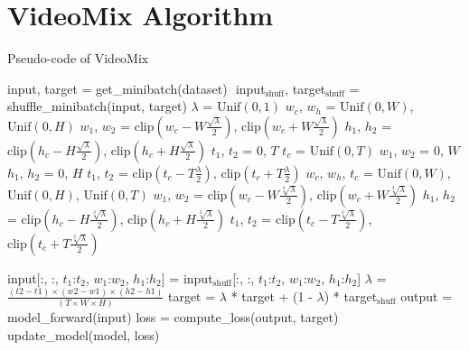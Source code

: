 \section{VideoMix Algorithm}
\label{appendix:algorithm}

\algnewcommand{}%
\algnewcommand{}%
\begin{algorithm*}[!t]
\small
  \caption{Pseudo-code of VideoMix}
  \begin{algorithmic}[1]
    \State input, target = get\_minibatch(dataset) 
    \Statex $ $  
            \State input$_\text{shuff}$, target$_\text{shuff}$ = shuffle\_minibatch(input, target) 
            \State $\lambda$ = $\text{Unif}(0,1)$
                \State $w_c$, $w_h$ = $\text{Unif}(0,W)$, $\text{Unif}(0,H)$
                \State $w_1$, $w_2$ = $\text{clip}(w_c-W\frac{\sqrt{\lambda}}{2})$, $\text{clip}(w_c+W\frac{\sqrt{\lambda}}{2})$
                \State $h_1$, $h_2$ = $\text{clip}(h_c-H\frac{\sqrt{\lambda}}{2})$, $\text{clip}(h_c+H\frac{\sqrt{\lambda}}{2})$
                \State $t_1$, $t_2$ = $0$, $T$
                \State $t_c$ = $\text{Unif}(0,T)$
                \State $w_1$, $w_2$ = $0$, $W$
                \State $h_1$, $h_2$ = $0$, $H$
                \State $t_1$, $t_2$ = $\text{clip}(t_c-T\frac{{\lambda}}{2})$, $\text{clip}(t_c+T\frac{{\lambda}}{2})$
                \State $w_c$, $w_h$, $t_c$ = $\text{Unif}(0,W)$, $\text{Unif}(0,H)$, $\text{Unif}(0,T)$
                \State $w_1$, $w_2$ = $\text{clip}(w_c-W\frac{\sqrt[3]{\lambda}}{2})$, $\text{clip}(w_c+W\frac{\sqrt[3]{\lambda}}{2})$
                \State $h_1$, $h_2$ = $\text{clip}(h_c-H\frac{\sqrt[3]{\lambda}}{2})$, $\text{clip}(h_c+H\frac{\sqrt[3]{\lambda}}{2})$
                \State $t_1$, $t_2$ = $\text{clip}(t_c-T\frac{\sqrt[3]{\lambda}}{2})$, $\text{clip}(t_c+T\frac{\sqrt[3]{\lambda}}{2})$                
            \EndIf
            
            \State input[:, :, $t_1$:$t_2$, $w_1$:$w_2$, $h_1$:$h_2$] = input$_\text{shuff}$[:, :, $t_1$:$t_2$, $w_1$:$w_2$, $h_1$:$h_2$]
            \State $\lambda$ = $\frac{(t2-t1)\times(w2-w1)\times(h2-h1)}{(T\times W\times H)}$ 
            \State target = $\lambda$ * target + (1 - $\lambda$) * target$_\text{shuff}$%
        \EndIf
        \State output = model\_forward(input)
        \State loss = compute\_loss(output, target)
        \State update\_model(model, loss)
    \EndFor
  \end{algorithmic}
  \label{alg:videomix_algorithm}
\end{algorithm*}

